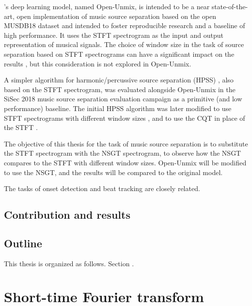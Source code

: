 \documentclass[letter,12pt,notitlepage]{article}
\begin{document}
\citet{umx}'s deep learning model, named Open-Unmix, is intended to be a near state-of-the-art, open implementation of music source separation based on the open MUSDB18 dataset \cite{musdb18} and intended to foster reproducible research and a baseline of high performance. It uses the STFT spectrogram as the input and output representation of musical signals. The choice of window size in the task of source separation based on STFT spectrograms can have a significant impact on the results \cite{musicsepwindow}, but this consideration is not explored in Open-Unmix.

A simpler algorithm for harmonic/percussive source separation (HPSS) \cite{fitzgerald1}, also based on the STFT spectrogram, was evaluated alongside Open-Unmix in the SiSec 2018 music source separation evaluation campaign \cite{sisec2018} as a primitive (and low performance) baseline. The initial HPSS algorithm was later modified to use STFT spectrograms with different window sizes \cite{driedger, fitzgerald2}, and to use the CQT in place of the STFT \cite{fitzgerald2}.

The objective of this thesis for the task of music source separation is to substitute the STFT spectrogram with the NSGT spectrogram, to observe how the NSGT compares to the STFT with different window sizes. Open-Unmix will be modified to use the NSGT, and the results will be compared to the original model.


The tasks of onset detection and beat tracking are closely related.

\subsection{Contribution and results}

\subsection{Outline}

This thesis is organized as follows. Section .

\vfill
\clearpage

\section{Short-time Fourier transform}
\label{sec:theorystft}

\vfill
\clearpage
\end{document}
